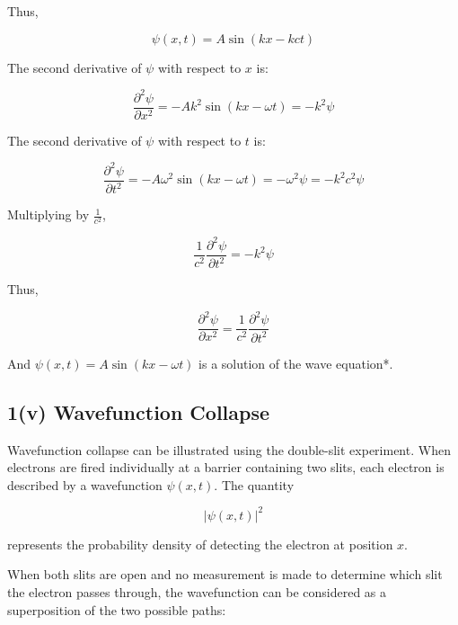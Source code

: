\documentclass{article}
\begin{document}
Thus,

\begin{equation*}
\psi(x,t) = A\sin{(kx-kct)}
\end{equation*}

The second derivative of $\psi$ with respect to $x$ is:

\begin{equation*}
\frac{\partial^2\psi}{\partial x^2} = -Ak^2\sin{(kx-\omega t)} = -k^2\psi
\end{equation*}

The second derivative of $\psi$ with respect to $t$ is:

\begin{equation*}
\frac{\partial^2\psi}{\partial t^2} = -A \omega^2 \sin{(kx-\omega t)} = - \omega^2 \psi = - k^2 c^2 \psi
\end{equation*}

Multiplying by $\frac{1}{c^2}$,

\begin{equation*}
\frac{1}{c^2} \frac{\partial^2\psi}{\partial t^2} = -k^2\psi
\end{equation*}

Thus,

\begin{equation*}
\frac{\partial^2\psi}{\partial x^2} = \frac{1}{c^2} \frac{\partial^2\psi}{\partial t^2}
\end{equation*}

And $\psi(x,t) = A\sin{(kx-\omega t)}$ is a solution of the wave equation*.


\subsection*{1(v) Wavefunction Collapse}

Wavefunction collapse can be illustrated using the double-slit experiment. When electrons are fired individually at a barrier containing two slits, each electron is described by a wavefunction $\psi(x,t)$. The quantity

\begin{equation*}
|\psi(x,t)|^2
\end{equation*}

represents the probability density of detecting the electron at position $x$.

\vspace{1\baselineskip}

When both slits are open and no measurement is made to determine which slit the electron passes through, the wavefunction can be considered as a superposition of the two possible paths:
\end{document}
